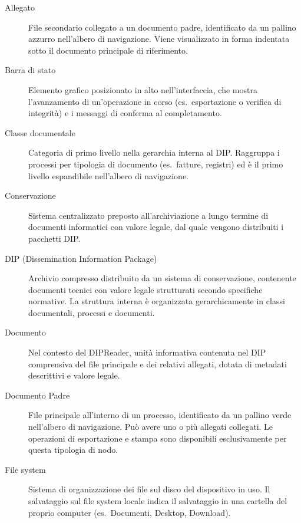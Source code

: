 \documentclass[a4paper,12pt]{article}
\begin{document}
\begin{description}

  \item[Allegato]
    File secondario collegato a un documento padre, identificato da un pallino azzurro
    nell'albero di navigazione. Viene visualizzato in forma indentata sotto il documento
    principale di riferimento.

  \item[Barra di stato]
    Elemento grafico posizionato in alto nell'interfaccia, che mostra l'avanzamento di un'operazione in corso 
    (es.\ esportazione o verifica di integrità) e i messaggi di conferma al completamento.

  \item[Classe documentale]
    Categoria di primo livello nella gerarchia interna al DIP. Raggruppa i processi
    per tipologia di documento (es.\ fatture, registri) ed è il primo
    livello espandibile nell'albero di navigazione.

  \item[Conservazione]
    Sistema centralizzato preposto all'archiviazione a lungo termine di documenti
    informatici con valore legale, dal quale vengono distribuiti i pacchetti DIP.
    
  \item[DIP (Dissemination Information Package)]
    Archivio compresso distribuito da un sistema di conservazione,
    contenente documenti tecnici con valore legale strutturati secondo specifiche
    normative. La struttura interna è organizzata gerarchicamente in classi
    documentali, processi e documenti.

  \item[Documento]
    Nel contesto del DIPReader, unità informativa contenuta nel DIP comprensiva
    del file principale e dei relativi allegati, dotata di metadati descrittivi
    e valore legale.

  \item[Documento Padre]
    File principale all'interno di un processo, identificato da un pallino verde
    nell'albero di navigazione. Può avere uno o più allegati collegati. Le operazioni
    di esportazione e stampa sono disponibili esclusivamente per questa tipologia
    di nodo.

  \item[File system]
    Sistema di organizzazione dei file sul disco del dispositivo in uso. Il salvataggio
    sul file system locale indica il salvataggio in una cartella del proprio computer
    (es.\ Documenti, Desktop, Download).


\end{description}
\end{document}
